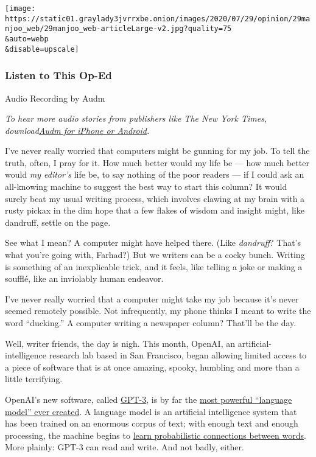 \texttt{[image: https://static01.graylady3jvrrxbe.onion/images/2020/07/29/opinion/29manjoo\_web/29manjoo\_web-articleLarge-v2.jpg?quality=75\\\&auto=webp\\\&disable=upscale]}

\hypertarget{listen-to-this-op-ed}{%
\subsubsection{Listen to This Op-Ed}\label{listen-to-this-op-ed}}

Audio Recording by Audm

\emph{To hear more audio stories from publishers like The New York
Times,
download}\href{https://www.audm.com/?utm_source=nytopinion\&utm_medium=embed\&utm_campaign=know_human_wrote}{\emph{Audm
for iPhone or Android}}\emph{.}

I've never really worried that computers might be gunning for my job. To
tell the truth, often, I pray for it. How much better would my life be
--- how much better would \emph{my editor's} life be, to say nothing of
the poor readers --- if I could ask an all-knowing machine to suggest
the best way to start this column? It would surely beat my usual writing
process, which involves clawing at my brain with a rusty pickax in the
dim hope that a few flakes of wisdom and insight might, like dandruff,
settle on the page.

See what I mean? A computer might have helped there. (Like
\emph{dandruff}? That's what you're going with, Farhad?) But we writers
can be a cocky bunch. Writing is something of an inexplicable trick, and
it feels, like telling a joke or making a soufflé, like an inviolably
human endeavor.

I've never really worried that a computer might take my job because it's
never seemed remotely possible. Not infrequently, my phone thinks I
meant to write the word ``ducking.'' A computer writing a newspaper
column? That'll be the day.

Well, writer friends, the day is nigh. This month, OpenAI, an
artificial-intelligence research lab based in San Francisco, began
allowing limited access to a piece of software that is at once amazing,
spooky, humbling and more than a little terrifying.

OpenAI's new software, called
\href{https://openai.com/blog/openai-api/}{GPT-3}, is by far the
\href{https://towardsdatascience.com/gpt-3-the-new-mighty-language-model-from-openai-a74ff35346fc}{most
powerful ``language model'' ever created}. A language model is an
artificial intelligence system that has been trained on an enormous
corpus of text; with enough text and enough processing, the machine
begins to
\href{https://www.analyticsvidhya.com/blog/2019/08/comprehensive-guide-language-model-nlp-python-code/}{learn
probabilistic connections between words}. More plainly: GPT-3 can read
and write. And not badly, either.

